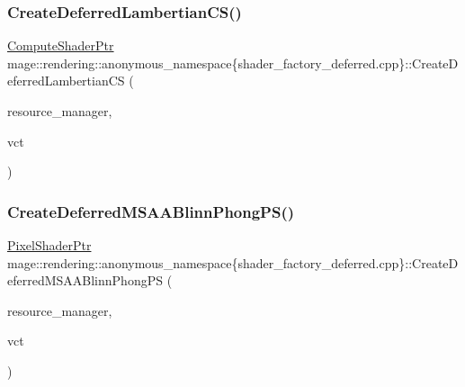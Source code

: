 \subsubsection{\texorpdfstring{Create\+Deferred\+Lambertian\+C\+S()}{CreateDeferredLambertianCS()}}
{\footnotesize\ttfamily \mbox{\hyperlink{namespacemage_1_1rendering_ab3dc9f2114f2e9255b91d9c051da52ea}{Compute\+Shader\+Ptr}} mage\+::rendering\+::anonymous\+\_\+namespace\{shader\+\_\+factory\+\_\+deferred.\+cpp\}\+::Create\+Deferred\+Lambertian\+CS (\begin{DoxyParamCaption}\item[{\mbox{\hyperlink{classmage_1_1rendering_1_1_resource_manager}{Resource\+Manager}} \&}]{resource\+\_\+manager,  }\item[{bool}]{vct }\end{DoxyParamCaption})}

\mbox{\label{namespacemage_1_1rendering_1_1anonymous__namespace_02shader__factory__deferred_8cpp_03_aeb2ee591f6ee093a67c2d0b2449e43cc}} 
\subsubsection{\texorpdfstring{Create\+Deferred\+M\+S\+A\+A\+Blinn\+Phong\+P\+S()}{CreateDeferredMSAABlinnPhongPS()}}
{\footnotesize\ttfamily \mbox{\hyperlink{namespacemage_1_1rendering_af03d922b228ee9c8542baaa2ecc9f259}{Pixel\+Shader\+Ptr}} mage\+::rendering\+::anonymous\+\_\+namespace\{shader\+\_\+factory\+\_\+deferred.\+cpp\}\+::Create\+Deferred\+M\+S\+A\+A\+Blinn\+Phong\+PS (\begin{DoxyParamCaption}\item[{\mbox{\hyperlink{classmage_1_1rendering_1_1_resource_manager}{Resource\+Manager}} \&}]{resource\+\_\+manager,  }\item[{bool}]{vct }\end{DoxyParamCaption})}

